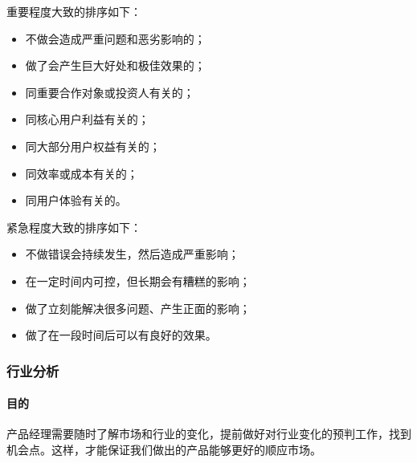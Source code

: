 \documentclass[letterpaper,11pt,english]{sphinxmanual}
\begin{document}
重要程度大致的排序如下：
%
\begin{footnote}[168]\sphinxAtStartFootnote
{}
%
\end{footnote}
\begin{itemize}
\item {} 
不做会造成严重问题和恶劣影响的；

\item {} 
做了会产生巨大好处和极佳效果的；

\item {} 
同重要合作对象或投资人有关的；

\item {} 
同核心用户利益有关的；

\item {} 
同大部分用户权益有关的；

\item {} 
同效率或成本有关的；

\item {} 
同用户体验有关的。

\end{itemize}

紧急程度大致的排序如下：
\begin{itemize}
\item {} 
不做错误会持续发生，然后造成严重影响；

\item {} 
在一定时间内可控，但长期会有糟糕的影响；

\item {} 
做了立刻能解决很多问题、产生正面的影响；

\item {} 
做了在一段时间后可以有良好的效果。

\end{itemize}


\subsubsection{行业分析}
\label{\detokenize{chapter_skill/industry_analysis:id1}}\label{\detokenize{chapter_skill/industry_analysis::doc}}

\paragraph{目的}
\label{\detokenize{chapter_skill/industry_analysis:id2}}
产品经理需要随时了解市场和行业的变化，提前做好对行业变化的预判工作，找到机会点。这样，才能保证我们做出的产品能够更好的顺应市场。
\end{document}
